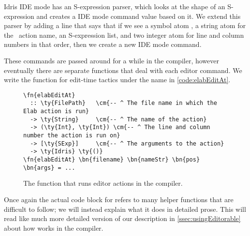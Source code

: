 Idris IDE mode has an S-expression parser, which looks at the shape of an
S-expression and creates a IDE mode command value based on it. We extend this
parser by adding a line that says that if we see a symbol atom ,
a string atom for the \Elab\ action name, an S-expression list, and two integer
atom for line and column numbers in that order, then we create a new IDE mode
command.

These commands are passed around for a while in the compiler, however
eventually there are separate functions that deal with each editor command. We
write the function for edit-time tactics under the name  in
\autoref{code:elabEditAt}.

\begin{figure}[ht]
\caption{The function  that runs editor actions in the compiler.}
\label{code:elabEditAt}
\begin{Verbatim}[framesep=2mm, label=\footnotesize{\normalfont{Haskell}}, labelposition=topline]
\fn{elabEditAt}
  :: \ty{FilePath}   \cm{-- ^ The file name in which the Elab action is run}
  -> \ty{String}     \cm{-- ^ The name of the action}
  -> (\ty{Int}, \ty{Int}) \cm{-- ^ The line and column number the action is run on}
  -> [\ty{SExp}]     \cm{-- ^ The arguments to the action}
  -> \ty{Idris} \ty{()}
\fn{elabEditAt} \bn{filename} \bn{nameStr} \bn{pos} \bn{args} = ...
\end{Verbatim}
\end{figure}

Once again the actual code block for  refers to many helper
functions that are difficult to follow; we will instead explain what it does in
detailed prose. This will read like much more detailed version of our
description in \autoref{ssec:usingEditorable} about how  works
in the compiler.

